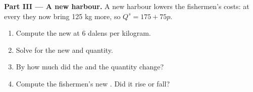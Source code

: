 \begin{problem}
\medskip
\noindent\textbf{Part III --- A new harbour.} A new harbour lowers the fishermen's costs: at every 
they now bring 125 kg more, so $Q^s = 175 + 75p$.
\begin{enumerate}[resume]
  \item Compute the new  at 6 dalens per kilogram.
  \item Solve for the new  and quantity.
  \item By how much did the  and the quantity change?
  \item Compute the fishermen's new . Did it rise or fall?
\end{enumerate}
\end{problem}
